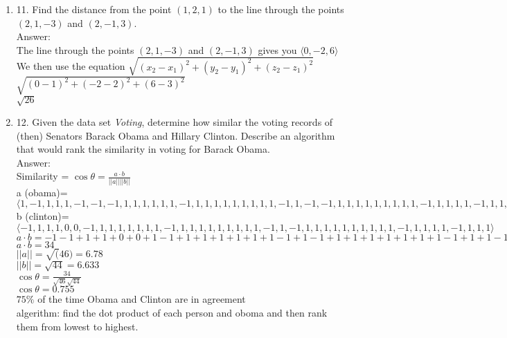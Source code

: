 \documentclass[11pt]{article}
\begin{document}
\begin{enumerate}
 \item 11. Find the distance from the point $(1, 2, 1)$ to the line through the points $(2, 1, -3)$ and $(2, -1, 3)$. 
 \\
 Answer:
 \\
 The line  through the points $(2, 1, -3)$ and $(2, -1, 3)$ gives you $\langle 0, -2, 6 \rangle$
 \\
 We then use the equation $\sqrt{(x_2-x_1)^2+(y_2-y_1)^2+(z_2-z_1)^2}$
 \\
 $\sqrt{(0-1)^2+(-2-2)^2+(6-3)^2}$
 \\
 $\sqrt{26}$
 
 \item 12. Given the data set \textit{Voting}, determine how similar the voting records of (then) Senators Barack Obama and Hillary Clinton.  Describe an algorithm that would rank the similarity in voting for Barack Obama. 
 \\
 Answer:
 \\
 Similarity = $ \cos \theta= \frac{a \cdot b}{||a|| ||b||}$
 \\
 a (obama)= $\langle 1, -1, 1, 1, 1, -1, -1, -1, 1, 1, 1, 1, 1, 1, -1, 1, 1, 1, 1, 1, 1, 1, 1, 1, -1, 1, -1, -1, 1, 1, 1, 1, 1, 1, 1, 1, 1, -1, 1, 1, 1, 1, -1, 1, 1, -1 \rangle$
 \\
 b (clinton)= $ \langle -1, 1, 1, 1, 0, 0, -1, 1, 1, 1, 1, 1, 1, 1, -1, 1, 1, 1, 1, 1, 1, 1, 1, 1, -1, 1, -1, 1, 1, 1, 1, 1, 1, 1, 1, 1, 1, -1, 1, 1, 1, 1, -1, 1, 1, 1 \rangle  $
 \\
 $a \cdot b = -1-1+1+1+0+0+1-1+1+1+1+1+1+1-1+1-1+1+1+1+1+1+1+1-1+1+1-1-1+1+1+1+1+1+1+1-1+1-1+1+1-1+1-1+1+1+1-1 $
 \\
  $a \cdot b = 34 $
  \\
  $||a||= \sqrt(46)= 6.78$
  \\
  $||b||= \sqrt{44}=6.633$
  \\
   $ \cos \theta=  \frac{34}{\sqrt{46}\sqrt{44}}$
   \\
   $ \cos \theta= 0.755$
   \\
   $75 \%$ of the time Obama and Clinton are in agreement 
   \\
   algerithm: find the dot product of each person and oboma and then rank them from lowest to highest.
   
   
 
 
 

\end{enumerate}
\end{document}
